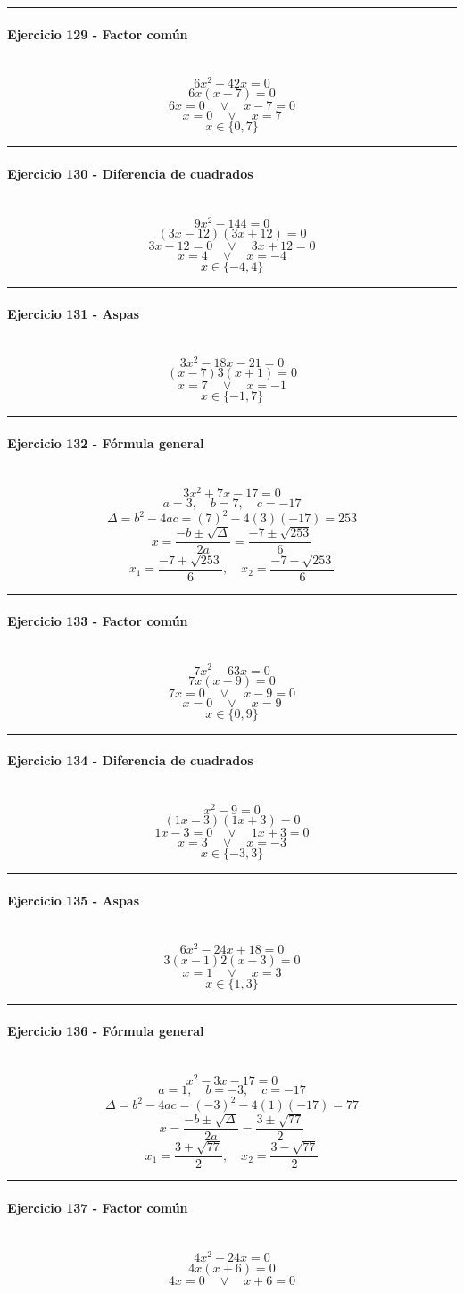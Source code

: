 \documentclass[10pt,a4paper]{article}
\newcommand{\res}[1]{\paragraph{#1}\mbox{}\\[-1.2em]}
\begin{document}
\vspace{1mm}\hrule\vspace{2mm}
\res{Ejercicio 129 - Factor común}
\[ 6 x^{2} - 42 x=0 \]
\[ 6x(x-7)=0 \]
\[ 6x=0 \quad \vee \quad x-7=0 \]
\[ x=0 \quad \vee \quad x=7 \]
\[ \boxed{x\in\{0,7\}} \]
\vspace{1mm}\hrule\vspace{2mm}
\res{Ejercicio 130 - Diferencia de cuadrados}
\[ 9 x^{2} - 144=0 \]
\[ (3x-12)(3x+12)=0 \]
\[ 3x-12=0 \quad \vee \quad 3x+12=0 \]
\[ x=4 \quad \vee \quad x=-4 \]
\[ \boxed{x\in\{-4,4\}} \]
\vspace{1mm}\hrule\vspace{2mm}
\res{Ejercicio 131 - Aspas}
\[ 3 x^{2} - 18 x - 21=0 \]
\[ (x-7)3(x+1)=0 \]
\[ x=7 \quad \vee \quad x=-1 \]
\[ \boxed{x\in\{-1,7\}} \]
\vspace{1mm}\hrule\vspace{2mm}
\res{Ejercicio 132 - Fórmula general}
\[ 3 x^{2} + 7 x - 17=0 \]
\[ a=3,\quad b=7,\quad c=-17 \]
\[ \Delta=b^2-4ac=(7)^2-4(3)(-17)=253 \]
\[ x=\frac{-b\pm\sqrt{\Delta}}{2a}=\frac{-7\pm\sqrt{253}}{6} \]
\[ \boxed{x_1=\frac{-7+\sqrt{253}}{6},\quad x_2=\frac{-7-\sqrt{253}}{6}} \]
\vspace{1mm}\hrule\vspace{2mm}
\res{Ejercicio 133 - Factor común}
\[ 7 x^{2} - 63 x=0 \]
\[ 7x(x-9)=0 \]
\[ 7x=0 \quad \vee \quad x-9=0 \]
\[ x=0 \quad \vee \quad x=9 \]
\[ \boxed{x\in\{0,9\}} \]
\vspace{1mm}\hrule\vspace{2mm}
\res{Ejercicio 134 - Diferencia de cuadrados}
\[ x^{2} - 9=0 \]
\[ (1x-3)(1x+3)=0 \]
\[ 1x-3=0 \quad \vee \quad 1x+3=0 \]
\[ x=3 \quad \vee \quad x=-3 \]
\[ \boxed{x\in\{-3,3\}} \]
\vspace{1mm}\hrule\vspace{2mm}
\res{Ejercicio 135 - Aspas}
\[ 6 x^{2} - 24 x + 18=0 \]
\[ 3(x-1)2(x-3)=0 \]
\[ x=1 \quad \vee \quad x=3 \]
\[ \boxed{x\in\{1,3\}} \]
\vspace{1mm}\hrule\vspace{2mm}
\res{Ejercicio 136 - Fórmula general}
\[ x^{2} - 3 x - 17=0 \]
\[ a=1,\quad b=-3,\quad c=-17 \]
\[ \Delta=b^2-4ac=(-3)^2-4(1)(-17)=77 \]
\[ x=\frac{-b\pm\sqrt{\Delta}}{2a}=\frac{3\pm\sqrt{77}}{2} \]
\[ \boxed{x_1=\frac{3+\sqrt{77}}{2},\quad x_2=\frac{3-\sqrt{77}}{2}} \]
\vspace{1mm}\hrule\vspace{2mm}
\res{Ejercicio 137 - Factor común}
\[ 4 x^{2} + 24 x=0 \]
\[ 4x(x+6)=0 \]
\[ 4x=0 \quad \vee \quad x+6=0 \]
\end{document}
